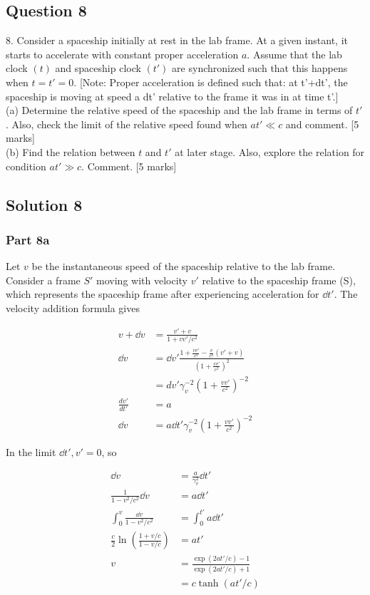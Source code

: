 \documentclass{article}
\begin{document}
\subsection{Question 8}
8. Consider a spaceship initially at rest in the lab frame. At a given instant, it starts to accelerate with constant proper acceleration $a$. Assume that the lab clock $(t)$ and spaceship clock $\left(t'\right)$ are synchronized such that this happens when $t=t'=0$. [Note: Proper acceleration is defined such that: at t'+dt', the spaceship is moving at speed a dt' relative to the frame it was in at time t'.] \\
(a) Determine the relative speed of the spaceship and the lab frame in terms of $t'$. Also, check the limit of the relative speed found when $a t' \ll c$ and comment. [5 marks] \\
(b) Find the relation between $t$ and $t'$ at later stage. Also, explore the relation for condition $a t' \gg c$. Comment. [5 marks] \\

\subsection{Solution 8}
\subsubsection{Part 8a}
Let $v$ be the instantaneous speed of the spaceship relative to the lab frame. Consider a frame $S'$ moving with velocity $v'$ relative to the spaceship frame (S), which represents the spaceship frame after experiencing acceleration for $\dd{t'}$. The velocity addition formula gives

\begin{align}
    v+\dd{v} &= \frac{v'+v}{1+vv'/c^2} \\
    \dd{v} &= \dd{v'}\frac{1+\frac{vv'}{c^2}-\frac{v}{c^2}(v'+v)}{\left(1+\frac{vv'}{c^2}\right)^2} \\
    &= dv' \gamma_v^{-2} \left(1+\frac{vv'}{c^2}\right)^{-2} \\
    \frac{dv'}{dt'} &= a \\
    \dd{v} &= a \dd{t'} \gamma_v^{-2} \left(1+\frac{vv'}{c^2}\right)^{-2}
\end{align}

In the limit $\dd{t'}, v'=0$, so

\begin{align}
    \dd{v} &= \frac{a}{\gamma_v^2} \dd{t'} \\
    \frac{1}{1-v^2/c^2} \dd{v} &= a \dd{t'} \\
    \int_0^v \frac{\dd{v}}{1-v^2/c^2} &= \int_0^{t'} a\dd{t'} \\
    \frac{c}{2} \ln\left(\frac{1+v/c}{1-v/c}\right) &= at' \\
    v &= \frac{\exp(2at'/c)-1}{\exp(2at'/c)+1} \\
    &= c \tanh(at'/c) 
\end{align}
\end{document}
